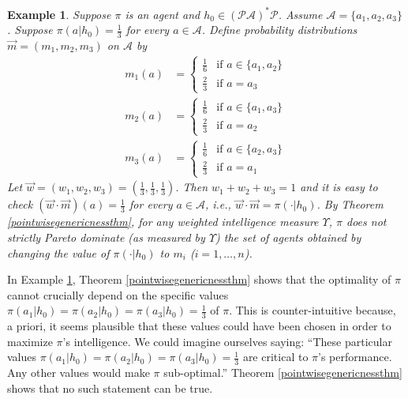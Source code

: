 \documentclass[twoside]{article}
\newtheorem{example}[theorem]{Example}
\begin{document}
\begin{example}
\label{genericnessexample}
    Suppose $\pi$ is an agent and $h_0\in(\mathcal P\mathcal A)^*\mathcal P$.
    Assume $\mathcal A=\{a_1,a_2,a_3\}$.
    Suppose $\pi(a|h_0)=\frac13$ for every $a\in\mathcal A$.
    Define probability distributions $\vec m=(m_1,m_2,m_3)$ on $\mathcal A$ by
    \begin{align*}
        m_1(a) &=
        \begin{cases}
            \frac16 &\mbox{if $a\in\{a_1,a_2\}$}\\
            \frac23 &\mbox{if $a=a_3$}
        \end{cases}\\
        m_2(a) &=
        \begin{cases}
            \frac16 &\mbox{if $a\in\{a_1,a_3\}$}\\
            \frac23 &\mbox{if $a=a_2$}
        \end{cases}\\
        m_3(a) &=
        \begin{cases}
            \frac16 &\mbox{if $a\in\{a_2,a_3\}$}\\
            \frac23 &\mbox{if $a=a_1$}
        \end{cases}
    \end{align*}
    Let $\vec w=(w_1,w_2,w_3)=(\frac13,\frac13,\frac13)$. Then $w_1+w_2+w_3=1$ and
    it is easy to check
    $(\vec w\cdot\vec m)(a)=\frac13$ for every $a\in\mathcal A$,
    i.e., $\vec w\cdot\vec m=\pi(\cdot|h_0)$.
    By Theorem \ref{pointwisegenericnessthm},
    for any weighted intelligence measure $\Upsilon$,
    $\pi$ does not strictly Pareto dominate (as measured by $\Upsilon$)
    the set of agents obtained by changing the value of $\pi(\cdot|h_0)$ to $m_i$
    ($i=1,\ldots,n$).
\end{example}

In Example \ref{genericnessexample}, Theorem \ref{pointwisegenericnessthm} shows
that the optimality of $\pi$ cannot crucially depend on the specific values
$\pi(a_1|h_0)=\pi(a_2|h_0)=\pi(a_3|h_0)=\frac13$ of $\pi$.
This is counter-intuitive because, a priori, it seems
plausible that these values could have been chosen
in order to maximize $\pi$'s intelligence. We could imagine ourselves
saying: ``These particular values $\pi(a_1|h_0)=\pi(a_2|h_0)=\pi(a_3|h_0)=\frac13$ are
critical to $\pi$'s
performance. Any other values would make $\pi$ sub-optimal.''
Theorem \ref{pointwisegenericnessthm} shows that no such statement can be true.
\end{document}
